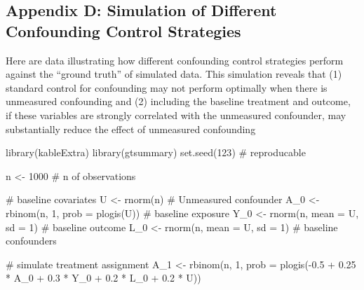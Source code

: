\documentclass[
  singlecolumn]{article}
\newenvironment{Shaded}{\begin{snugshade}}{\end{snugshade}}
\newcommand{\AttributeTok}[1]{\textcolor[rgb]{0.40,0.45,0.13}{#1}}
\newcommand{\CommentTok}[1]{\textcolor[rgb]{0.37,0.37,0.37}{#1}}
\newcommand{\DecValTok}[1]{\textcolor[rgb]{0.68,0.00,0.00}{#1}}
\newcommand{\FloatTok}[1]{\textcolor[rgb]{0.68,0.00,0.00}{#1}}
\newcommand{\FunctionTok}[1]{\textcolor[rgb]{0.28,0.35,0.67}{#1}}
\newcommand{\NormalTok}[1]{\textcolor[rgb]{0.00,0.23,0.31}{#1}}
\newcommand{\OtherTok}[1]{\textcolor[rgb]{0.00,0.23,0.31}{#1}}
\newcommand{\SpecialCharTok}[1]{\textcolor[rgb]{0.37,0.37,0.37}{#1}}
\begin{document}
\subsection{Appendix D: Simulation of Different Confounding Control
Strategies}\label{appendix-d-simulation-of-different-confounding-control-strategies}

Here are data illustrating how different confounding control strategies
perform against the ``ground truth'' of simulated data. This simulation
reveals that (1) standard control for confounding may not perform
optimally when there is unmeasured confounding and (2) including the
baseline treatment and outcome, if these variables are strongly
correlated with the unmeasured confounder, may substantially reduce the
effect of unmeasured confounding

\begin{Shaded}
\begin{Highlighting}[]
\FunctionTok{library}\NormalTok{(kableExtra)}
\FunctionTok{library}\NormalTok{(gtsummary)}
\FunctionTok{set.seed}\NormalTok{(}\DecValTok{123}\NormalTok{) }\CommentTok{\# reproducable}

\NormalTok{n }\OtherTok{\textless{}{-}} \DecValTok{1000} \CommentTok{\# n of observations}

\CommentTok{\#  baseline covariates}
\NormalTok{U }\OtherTok{\textless{}{-}} \FunctionTok{rnorm}\NormalTok{(n) }\CommentTok{\# Unmeasured confounder}
\NormalTok{A\_0 }\OtherTok{\textless{}{-}} \FunctionTok{rbinom}\NormalTok{(n, }\DecValTok{1}\NormalTok{, }\AttributeTok{prob =} \FunctionTok{plogis}\NormalTok{(U)) }\CommentTok{\# baseline exposure}
\NormalTok{Y\_0 }\OtherTok{\textless{}{-}} \FunctionTok{rnorm}\NormalTok{(n, }\AttributeTok{mean =}\NormalTok{ U, }\AttributeTok{sd =} \DecValTok{1}\NormalTok{) }\CommentTok{\# baseline outcome}
\NormalTok{L\_0 }\OtherTok{\textless{}{-}} \FunctionTok{rnorm}\NormalTok{(n, }\AttributeTok{mean =}\NormalTok{ U, }\AttributeTok{sd =} \DecValTok{1}\NormalTok{) }\CommentTok{\# baseline confounders}


\CommentTok{\# simulate treatment assignment}
\NormalTok{A\_1 }\OtherTok{\textless{}{-}}
  \FunctionTok{rbinom}\NormalTok{(n, }\DecValTok{1}\NormalTok{, }\AttributeTok{prob =} \FunctionTok{plogis}\NormalTok{(}\SpecialCharTok{{-}}\FloatTok{0.5} \SpecialCharTok{+} 
                               \FloatTok{0.25} \SpecialCharTok{*}\NormalTok{ A\_0 }\SpecialCharTok{+} 
                               \FloatTok{0.3} \SpecialCharTok{*}\NormalTok{ Y\_0 }\SpecialCharTok{+} 
                               \FloatTok{0.2} \SpecialCharTok{*}\NormalTok{ L\_0 }\SpecialCharTok{+}  
                               \FloatTok{0.2} \SpecialCharTok{*}\NormalTok{ U))}



\end{Highlighting}
\end{Shaded}
\end{document}
